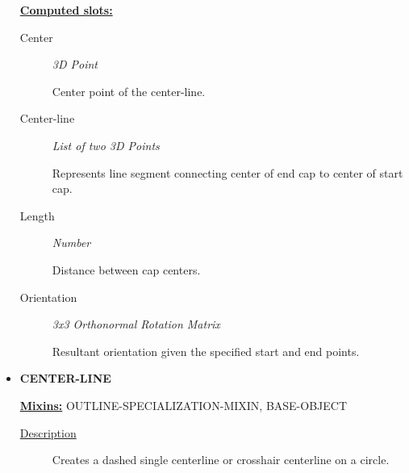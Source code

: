 \documentclass [11pt]{book}
\begin{document}
\begin{itemize}
\textbf{
\underline{Computed slots:}}

\begin{description}

\item [Center]
\emph{3D Point}

 Center point of the center-line.




\item [Center-line]
\emph{List of two 3D Points}

 Represents line segment connecting center of end cap to center of start cap.




\item [Length]
\emph{Number}

 Distance between cap centers.




\item [Orientation]
\emph{3x3 Orthonormal Rotation Matrix}

 Resultant orientation given the specified start and end points.




\end{description}







\item {}
\textbf{CENTER-LINE}


\textbf{
\underline{Mixins:}} OUTLINE-SPECIALIZATION-MIXIN, BASE-OBJECT





\begin{description}

\item [
\underline{Description}]


Creates a dashed single centerline or crosshair centerline on a circle.



\end{description}




\begin{figure}
\begin{lrbox}{\boxedverb}
\begin{minipage}{\linewidth}
{\small

}
\end{minipage}
\end{lrbox}
\end{figure}
\end{itemize}
\end{document}

